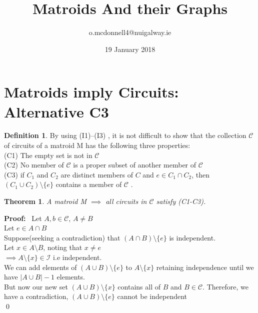 \documentclass{article}
\title{Matroids And their Graphs}
\author{o.mcdonnell4@nuigalway.ie }
\date{19 January 2018}
\theoremstyle{plain}
\newtheorem{thm}{Theorem}[section]
\theoremstyle{definition}
\newtheorem{defn}{Definition}[section]
\theoremstyle{remark}
\newcommand\Proof{%
    \textbf{Proof:}~%
}
\begin{document}
\maketitle
 
 \section{Matroids imply Circuits: Alternative C3}
 \begin{defn} By using (I1)–(I3) , it is not difficult to show that the collection $\mathcal{C}$ of circuits of a matroid M has the following three properties:\\
(C1) The empty set is not in $\mathcal{C}$\\
(C2) No member of $\mathcal{C}$ is a proper subset of another member of $\mathcal{C}$\\
(C3) if $ C_1 $ and $ C_2 $ are distinct members of $ C $ and 
$ e \in C_1 \cap C_2 $, then $ (C_1 \cup C_2 ) \setminus \{e\} $ contains a member of $\mathcal{C}$ .
 \end{defn}
 
 \vspace{5mm}
 
 \begin{thm}
 A matroid M $\implies$ all circuits in $\mathcal{C}$ satisfy (C1-C3).
 \end{thm}
 
 \noindent\Proof Let $A,b \in \mathcal{C}$, $A \neq B$
 \\
 \noindent Let $e \in A \cap B$
 \\
 \noindent Suppose(seeking a contradiction) that $(A \cap B) \setminus \{e\}$ is independent.
 \\
 \noindent Let $x \in A \setminus B$, noting that $x \neq e$
 \\
 \noindent $\implies A \setminus \{x\} \in \mathcal{I}$ i.e independent.
 \\
 \noindent We can add elements of $(A \cup B) \setminus \{e\}$ to $A \setminus \{x\}$ retaining independence until we have $|A \cup B| - 1$ elements.
 \\
 \noindent But now our new set $(A \cup B) \setminus \{x\}$ contains all of $B$ and $B \in \mathcal{C}$. Therefore, we have a contradiction, $(A \cup B) \setminus \{e\}$ cannot be independent
 \\
 \qed
 
\end{document}
